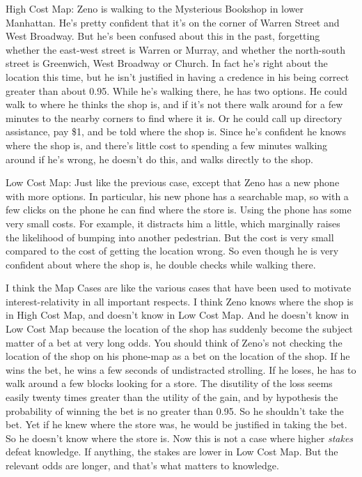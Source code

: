 \documentclass[oneside]{book}
\begin{document}
\begin{description*}
\item[High Cost Map:] Zeno is walking to the Mysterious Bookshop in lower Manhattan. He's pretty confident that it's on the corner of Warren Street and West Broadway. But he's been confused about this in the past, forgetting whether the east-west street is Warren or Murray, and whether the north-south street is Greenwich, West Broadway or Church. In fact he's right about the location this time, but he isn't justified in having a credence in his being correct greater than about 0.95. While he's walking there, he has two options. He could walk to where he thinks the shop is, and if it's not there walk around for a few minutes to the nearby corners to find where it is. Or he could call up directory assistance, pay \$1, and be told where the shop is. Since he's confident he knows where the shop is, and there's little cost to spending a few minutes walking around if he's wrong, he doesn't do this, and walks directly to the shop.
\item[Low Cost Map:] Just like the previous case, except that Zeno has a new phone with more options. In particular, his new phone has a searchable map, so with a few clicks on the phone he can find where the store is. Using the phone has some very small costs. For example, it distracts him a little, which marginally raises the likelihood of bumping into another pedestrian. But the cost is very small compared to the cost of getting the location wrong. So even though he is very confident about where the shop is, he double checks while walking there.
\end{description*}

\noindent I think the Map Cases are like the various cases that have been used to motivate interest-relativity in all important respects. I think Zeno knows where the shop is in High Cost Map, and doesn't know in Low Cost Map. And he doesn't know in Low Cost Map because the location of the shop has suddenly become the subject matter of a bet at very long odds. You should think of Zeno's not checking the location of the shop on his phone-map as a bet on the location of the shop. If he wins the bet, he wins a few seconds of undistracted strolling. If he loses, he has to walk around a few blocks looking for a store. The disutility of the loss seems easily twenty times greater than the utility of the gain, and by hypothesis the probability of winning the bet is no greater than 0.95. So he shouldn't take the bet. Yet  if he knew where the store was, he would be justified in taking the bet. So he doesn't know where the store is. Now this is not a case where higher \textit{stakes} defeat knowledge. If anything, the stakes are lower in Low Cost Map. But the relevant odds are longer, and that's what matters to knowledge.
\end{document}
